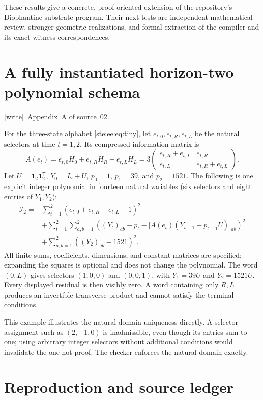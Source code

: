 \documentclass[11pt,letterpaper]{article}
\theoremstyle{definition}
\theoremstyle{remark}
\newcommand{\one}{\mathbf 1}
\newcommand{\transpose}{^{\mathsf T}}
\newcommand{\wtag}{\textup{[write]}}
\begin{document}
These results give a concrete, proof-oriented extension of the repository's
Diophantine-substrate program. Their next tests are independent mathematical
review, stronger geometric realizations, and formal extraction of the
compiler and its exact witness correspondences.

\appendix
\section{A fully instantiated horizon-two polynomial schema}
\label{ste:ee:app:tinyquartic}

\noindent\wtag\ Appendix~A of source~02.


For the three-state alphabet \eqref{ste:ee:eq:tiny}, let $e_{t,0},e_{t,R},e_{t,L}$ be the
natural selectors at time $t=1,2$. Its compressed information matrix is
\[
 A(e_t)=e_{t,0}H_0+e_{t,R}H_R+e_{t,L}H_L
 =3\begin{pmatrix}
 e_{t,R}+e_{t,L}&e_{t,R}\\
 e_{t,L}&e_{t,R}+e_{t,L}
 \end{pmatrix}.
\]
Let $U=\one_2\one_2\transpose$, $Y_0=I_2+U$, $p_0=1$, $p_1=39$, and
$p_2=1521$. The following is one explicit integer polynomial in fourteen natural
variables (six selectors and eight entries of $Y_1,Y_2$):
\begin{align*}
 \mathcal I_2={}&
 \sum_{t=1}^2(e_{t,0}+e_{t,R}+e_{t,L}-1)^2\\
 &+\sum_{t=1}^2\sum_{a,b=1}^2
 \left((Y_t)_{ab}-p_t-
       \bigl[A(e_t)(Y_{t-1}-p_{t-1}U)\bigr]_{ab}\right)^2\\
 &+\sum_{a,b=1}^2((Y_2)_{ab}-1521)^2.
\end{align*}
All finite sums, coefficients, dimensions, and constant matrices are specified;
expanding the squares is optional and does not change the polynomial. The word
$(0,L)$ gives selectors $(1,0,0)$ and $(0,0,1)$, with $Y_1=39U$ and $Y_2=1521U$.
Every displayed residual is then visibly zero. A word containing only $R,L$
produces an invertible transverse product and cannot satisfy the terminal
conditions.

This example illustrates the natural-domain uniqueness directly. A selector
assignment such as $(2,-1,0)$ is inadmissible, even though its entries sum to one;
using arbitrary integer selectors without additional conditions would invalidate
the one-hot proof. The checker enforces the natural domain exactly.

\section{Reproduction and source ledger}
\label{ste:ee:app:reproduction}
\end{document}

